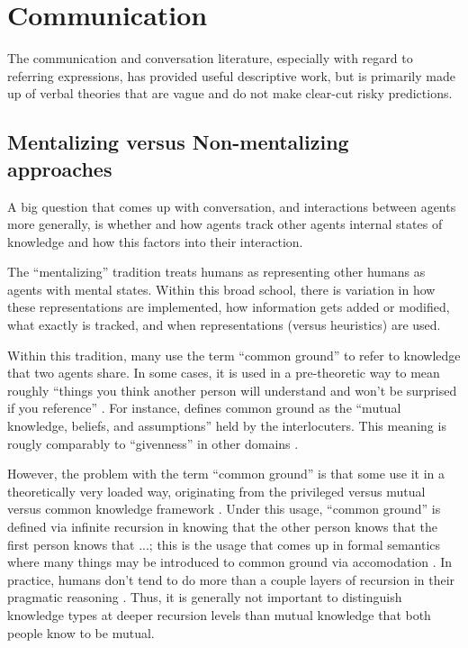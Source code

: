 \documentclass[]{article}
\begin{document}

\section{Communication}
The communication and conversation literature, especially with regard to referring expressions, has provided useful descriptive work, but is primarily made up of verbal theories that are vague and do not make clear-cut risky predictions. 

\subsection{Mentalizing versus Non-mentalizing approaches}

A big question that comes up with conversation, and interactions between agents more generally, is whether and how agents track other agents internal states of knowledge and how this factors into their interaction.

The ``mentalizing'' tradition treats humans as representing other humans as agents with mental states. Within this broad school, there is variation in how these representations are implemented, how information gets added or modified, what exactly is tracked, and when representations (versus heuristics) are used. 

Within this tradition, many use the term ``common ground'' to refer to knowledge that two agents share. In some cases, it is used in a pre-theoretic way to mean roughly ``things you think another person will understand and won't be surprised if you reference'' \citep{leung2023, TODO}. For instance,  \citet{hanna2003} defines common ground as the ``mutual knowledge, beliefs, and assumptions'' held by the interlocuters. This meaning is rougly comparably to ``givenness'' in other domains \citep{fay2010}. 

 However, the problem with the term ``common ground'' is that some use it in a theoretically very loaded way, originating from the privileged versus mutual versus common knowledge framework \citep{TODO}. Under this usage, ``common ground'' is defined via infinite recursion in knowing that the other person knows that the first person knows that ...; this is the usage that comes up in formal semantics where many things may be introduced to common ground via accomodation \citep{horton1996, TODO}. In practice, humans don't tend to do more than a couple layers of recursion in their pragmatic reasoning \citep{franke2016}. Thus, it is generally not important to distinguish knowledge types at deeper recursion levels than mutual knowledge that both people know to be mutual. 
\end{document}
